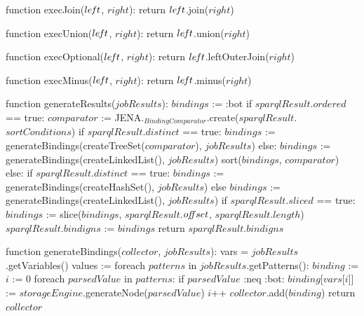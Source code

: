 function execJoin($le\textrm{\emph{f}}t$, $right$):
    return $le\textrm{\emph{f}}t$.join($right$)

function execUnion($le\textrm{\emph{f}}t$, $right$):
    return $le\textrm{\emph{f}}t$.union($right$)

function execOptional($le\textrm{\emph{f}}t$, $right$):
    return $le\textrm{\emph{f}}t$.leftOuterJoin($right$)

function execMinus($le\textrm{\emph{f}}t$, $right$):
    return $le\textrm{\emph{f}}t$.minus($right$)

function generateResults($jobResults$):
    $bindings$ := :bot
    if $sparqlResult$.$ordered$ == true:
        $comparator$ := JENA.$_{BindingComparator}$.create($sparqlResult$.$sortConditions$)
        if $sparqlResult$.$distinct$ == true:
            $bindings$ := generateBindings(createTreeSet($comparator$), $jobResults$)
        else:
            $bindings$ := generateBindings(createLinkedList(), $jobResults$)
            sort($bindings$, $comparator$)
    else:
        if $sparqlResult$.$distinct$ == true:
            $bindings$ := generateBindings(createHashSet(), $jobResults$)
        else
            $bindings$ := generateBindings(createLinkedList(), $jobResults$)
    if $sparqlResult$.$sliced$ == true:
        $bindings$ := slice($bindings$, $sparqlResult$.$o\textrm{\emph{ff}}set$, $sparqlResult$.$length$)
    $sparqlResult$.$bindigns$ := $bindings$
    return $sparqlResult$.$bindigns$

function generateBindings($collector$, $jobResults$):
    vars = $jobResults$.getVariables()
    values := {}
    foreach $patterns$ in $jobResults$.getPatterns():
        $binding$ := {}
        $i$ := 0
        foreach $parsedValue$ in $patterns$:
            if $parsedValue$ :neq :bot:
                $binding$[$vars$[$i$]] := $storageEngine$.generateNode($parsedValue$)
            $i$++
        $collector$.add($binding$)
    return $collector$